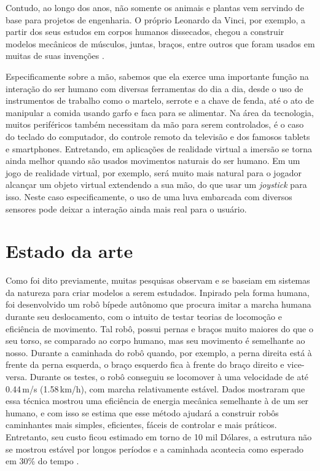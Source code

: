 \documentclass[
	12pt,				%
	openright,			%
	oneside,			%
	a4paper,			%
	english,			%
	brazil				%
	]{abntex2}
\begin{document}
		Contudo, ao longo dos anos, não somente os animais e plantas vem servindo de base para projetos de engenharia. O próprio Leonardo da Vinci, por exemplo, a partir dos seus estudos em corpos humanos dissecados, chegou a construir modelos mecânicos de músculos, juntas, braços, entre outros que foram usados em muitas de suas invenções \cite{rosheim2006leonardo}.
		
		Especificamente sobre a mão, sabemos que ela exerce uma importante função na interação do ser humano com diversas ferramentas do dia a dia, desde o uso de instrumentos de trabalho como o martelo, serrote e a chave de fenda, até o ato de manipular a comida usando garfo e faca para se alimentar. Na área da tecnologia, muitos periféricos também necessitam da mão para serem controlados, é o caso do teclado do computador, do controle remoto da televisão e dos famosos tablets e smartphones.	Entretando, em aplicações de realidade virtual a imersão se torna ainda melhor quando são usados movimentos naturais do ser humano. Em um jogo de realidade virtual, por exemplo, será muito mais natural para o jogador alcançar um objeto virtual extendendo a sua mão, do que usar um \textit{joystick} para isso. Neste caso especificamente, o uso de uma luva embarcada com diversos sensores pode deixar a interação ainda mais real para o usuário. 
	

		\section{Estado da arte}

		Como foi dito previamente, muitas pesquisas observam e se baseiam em sistemas da natureza para criar modelos a serem estudados. Inpirado pela forma humana, foi desenvolvido um robô bípede autônomo que procura imitar a marcha humana durante seu deslocamento, com o intuito de testar teorias de locomoção e eficiência de movimento. Tal robô, possui pernas e braços muito maiores do que o seu torso, se comparado ao corpo humano, mas seu movimento é semelhante ao nosso. Durante a caminhada do robô quando, por exemplo, a perna direita está à frente da perna esquerda, o braço esquerdo fica à frente do braço direito e vice-versa. Durante os testes, o robô conseguiu se locomover à uma velocidade de até 0.44$\,$m/s (1.58$\,$km/h), com marcha relativamente estável. Dados mostraram que essa técnica mostrou uma eficiência de energia mecânica semelhante à de um ser humano, e com isso se estima que esse método ajudará a construir robôs caminhantes mais simples, eficientes, fáceis de controlar e mais práticos. Entretanto, seu custo ficou estimado em torno de 10 mil Dólares, a estrutura não se mostrou estável por longos períodos e a caminhada acontecia como esperado em 30\% do tempo \cite{collins2005walkrobot}.
\end{document}

